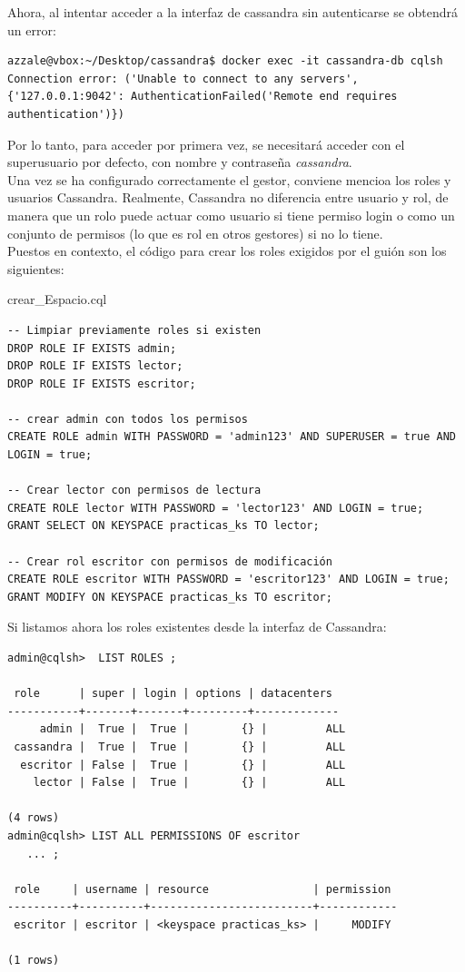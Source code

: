 \documentclass{article}
\begin{document}
Ahora, al intentar acceder a la interfaz de cassandra sin autenticarse se obtendrá un error:
\begin{tcolorbox}[colback=black, coltext=white, fontupper=\ttfamily, title=Terminal]
\begin{verbatim}
azzale@vbox:~/Desktop/cassandra$ docker exec -it cassandra-db cqlsh
Connection error: ('Unable to connect to any servers', {'127.0.0.1:9042': AuthenticationFailed('Remote end requires authentication')})
\end{verbatim}
\end{tcolorbox}
Por lo tanto, para acceder por primera vez, se necesitará acceder con el superusuario por defecto, con nombre  y contraseña \textit{cassandra}. 
\\

Una vez se ha configurado correctamente el gestor, conviene mencioa los roles y usuarios Cassandra. Realmente, Cassandra no diferencia entre usuario y rol, de manera que un rolo puede actuar como usuario si tiene permiso login o como un conjunto de permisos (lo que es rol en otros gestores) si no lo tiene. 
\\
Puestos en contexto, el código para crear los roles exigidos por el guión son los siguientes:
\begin{scriptbox}{crear\_Espacio.cql}
\begin{verbatim}
-- Limpiar previamente roles si existen 
DROP ROLE IF EXISTS admin;
DROP ROLE IF EXISTS lector;
DROP ROLE IF EXISTS escritor;

-- crear admin con todos los permisos
CREATE ROLE admin WITH PASSWORD = 'admin123' AND SUPERUSER = true AND LOGIN = true;

-- Crear lector con permisos de lectura
CREATE ROLE lector WITH PASSWORD = 'lector123' AND LOGIN = true;
GRANT SELECT ON KEYSPACE practicas_ks TO lector;

-- Crear rol escritor con permisos de modificación
CREATE ROLE escritor WITH PASSWORD = 'escritor123' AND LOGIN = true;
GRANT MODIFY ON KEYSPACE practicas_ks TO escritor;
\end{verbatim}
\end{scriptbox}
Si listamos ahora los roles existentes desde la interfaz de Cassandra:
\begin{tcolorbox}[colback=black, coltext=white, fontupper=\ttfamily, title=Terminal]
\begin{verbatim}
admin@cqlsh>  LIST ROLES ;

 role      | super | login | options | datacenters
-----------+-------+-------+---------+-------------
     admin |  True |  True |        {} |         ALL
 cassandra |  True |  True |        {} |         ALL
  escritor | False |  True |        {} |         ALL
    lector | False |  True |        {} |         ALL

(4 rows)
admin@cqlsh> LIST ALL PERMISSIONS OF escritor
   ... ;

 role     | username | resource                | permission
----------+----------+-------------------------+------------
 escritor | escritor | <keyspace practicas_ks> |     MODIFY

(1 rows)
\end{verbatim}
\end{tcolorbox}
\end{document}
